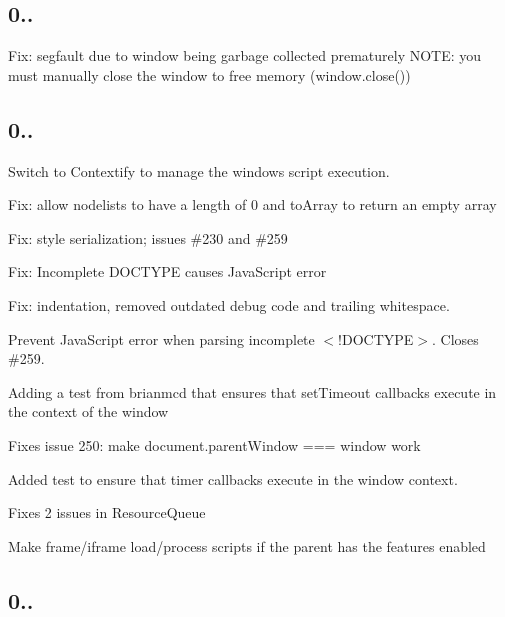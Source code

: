 \subsection*{0..}


\begin{DoxyItemize}
\item Fix\+: segfault due to window being garbage collected prematurely N\+O\+TE\+: you must manually close the window to free memory (window.\+close())
\end{DoxyItemize}

\subsection*{0..}


\begin{DoxyItemize}
\item Switch to Contextify to manage the window\textquotesingle{}s script execution.
\item Fix\+: allow nodelists to have a length of 0 and to\+Array to return an empty array
\item Fix\+: style serialization; issues \#230 and \#259
\item Fix\+: Incomplete D\+O\+C\+T\+Y\+PE causes Java\+Script error
\item Fix\+: indentation, removed outdated debug code and trailing whitespace.
\item Prevent Java\+Script error when parsing incomplete {\ttfamily $<$!\+D\+O\+C\+T\+Y\+PE$>$}. Closes \#259.
\item Adding a test from brianmcd that ensures that set\+Timeout callbacks execute in the context of the window
\item Fixes issue 250\+: make {\ttfamily document.\+parent\+Window === window} work
\item Added test to ensure that timer callbacks execute in the window context.
\item Fixes 2 issues in Resource\+Queue
\item Make frame/iframe load/process scripts if the parent has the features enabled
\end{DoxyItemize}

\subsection*{0..}


